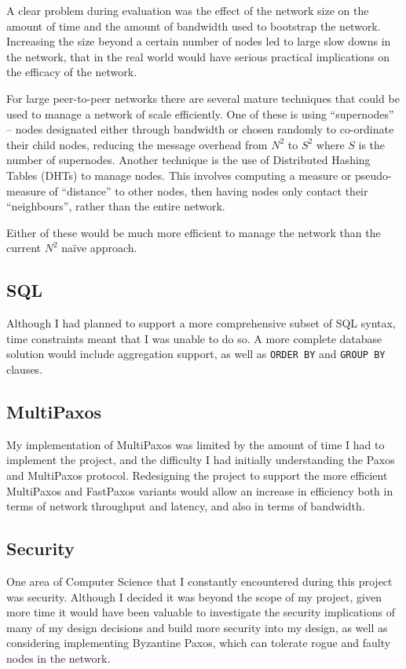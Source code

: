 \documentclass[12pt,twoside,notitlepage]{report}
\begin{document}
A clear problem during evaluation was the effect of the network size on the amount of time and the
amount of bandwidth used to bootstrap the network. Increasing the size beyond a certain number of
nodes led to large slow downs in the network, that in the real world would have serious practical
implications on the efficacy of the network.

For large peer-to-peer networks there are several mature techniques that could be used to manage a
network of scale efficiently. One of these is using ``supernodes'' -- nodes designated either
through bandwidth or chosen randomly to co-ordinate their child nodes, reducing the message
overhead from $N^2$ to $S^2$ where $S$ is the number of supernodes. Another technique is the use
of Distributed Hashing Tables (DHTs) to manage nodes. This involves computing a measure or
pseudo-measure of ``distance'' to other nodes, then having nodes only contact their
``neighbours'', rather than the entire network.

Either of these would be much more efficient to manage the network than the current $N^2$ na\"ive
approach.

\subsection{SQL}

Although I had planned to support a more comprehensive subset of SQL syntax, time constraints meant
that I was unable to do so. A more complete database solution would include aggregation support,
as well as \verb+ORDER BY+ and \verb+GROUP BY+ clauses.

\subsection{MultiPaxos}

My implementation of MultiPaxos was limited by the amount of time I had to implement the project,
and the difficulty I had initially understanding the Paxos and MultiPaxos protocol. Redesigning
the project to support the more efficient MultiPaxos and FastPaxos variants would allow an
increase in efficiency both in terms of network throughput and latency, and also in terms of
bandwidth.

\subsection{Security}

One area of Computer Science that I constantly encountered during this project was security.
Although I decided it was beyond the scope of my project, given more time it would have been
valuable to investigate the security implications of many of my design decisions and build more
security into my design, as well as considering implementing Byzantine Paxos, which can tolerate
rogue and faulty nodes in the network.
\end{document}
